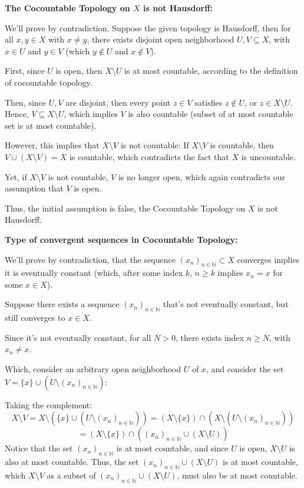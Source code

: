 \documentclass{article}
\begin{document}
\hfill

\hfill

\textbf{The Cocountable Topology on $X$ is not Hausdorff:}

We'll prove by contradiction. Suppose the given topology is Hausdorff, then for all $x,y\in X$ with $x\neq y$, there exists disjoint open neighborhood $U,V\subseteq X$,
with $x\in U$ and $y\in V$ (which $y\notin U$ and $x\notin V$).

First, since $U$ is open, then $X\setminus U$ is at most countable, according to the definition of cocountable topology.

Then, since $U,V$ are disjoint, then every point $z\in V$ satisfies $z\notin U$, or $z\in X\setminus U$. Hence, $V\subseteq X\setminus U$, which implies $V$ is also countable (subset of at most countable set is at most countable).

However, this implies that $X\setminus V$ is not countable: If $X\setminus V$ is countable, then $V\cup (X\setminus V)=X$ is countable, which contradicts the fact that $X$ is uncountable.

Yet, if $X\setminus V$ is not countable, $V$ is no longer open, which again contradicts our assumption that $V$ is open.

Thus, the initial assumption is false, the Cocountable Topology on $X$ is not Hausdorff.

\hfill

\hfill

\textbf{Type of convergent sequences in Cocountable Topology:}

We'll prove by contradiction, that the sequence $(x_n)_{n\in\mathbb{N}}\subset X$ converges implies it is eventually constant (which, after some index $k$, $n\geq k$ implies $x_n=x$ for some $x\in X$).

Suppose there exists a sequence $(x_n)_{n\in\mathbb{N}}$ that's not eventually constant, but still converges to $x\in X$.

Since it's not eventually constant, for all $N>0$, there exists index $n\geq N$, with $x_n \neq x$. 

Which, consider an arbitrary open neighborhood $U$ of $x$, and consider the set $V=\{x\}\cup (U\setminus (x_n)_{n\in\mathbb{N}})$:

Taking the complement:
$$X\setminus V = X\setminus(\{x\}\cup (U\setminus (x_n)_{n\in\mathbb{N}})) = (X\setminus \{x\})\cap (X\setminus(U\setminus (x_n)_{n\in\mathbb{N}}))$$
$$= (X\setminus\{x\})\cap ((x_n)_{n\in\mathbb{N}}\cup (X\setminus U))$$
Notice that the set $(x_n)_{n\in\mathbb{N}}$ is at most countable, and since $U$ is open, $X\setminus U$ is also at most countable.
Thus, the set $(x_n)_{n\in\mathbb{N}}\cup (X\setminus U)$ is at most countable, which $X\setminus V$ as a subset of $(x_n)_{n\in\mathbb{N}}\cup (X\setminus U)$, must also be at most countable.
\end{document}

